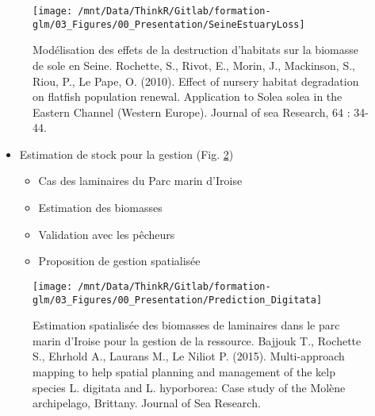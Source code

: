 \documentclass[french,a4paper]{article}
\providecommand{\tightlist}{%
  \setlength{\itemsep}{0pt}\setlength{\parskip}{0pt}}
\begin{document}
\begin{figure}[!h]

{\centering \texttt{[image: /mnt/Data/ThinkR/Gitlab/formation-glm/03\_Figures/00\_Presentation/SeineEstuaryLoss]} 

}

\caption{Modélisation des effets de la destruction d'habitats sur la biomasse de sole en Seine. Rochette, S., Rivot, E., Morin, J., Mackinson, S., Riou, P., Le Pape, O. (2010). Effect of nursery habitat degradation on flatfish population renewal. Application to Solea solea in the Eastern Channel (Western Europe). Journal of sea Research, 64 : 34-44.}\label{fig:figHSIConclusion}
\end{figure}

\begin{itemize}
\tightlist
\item
  Estimation de stock pour la gestion (Fig. \ref{fig:figHSIConcl2})

  \begin{itemize}
  \tightlist
  \item
    Cas des laminaires du Parc marin d'Iroise
  \item
    Estimation des biomasses
  \item
    Validation avec les pêcheurs
  \item
    Proposition de gestion spatialisée
  \end{itemize}
\end{itemize}



\begin{figure}[!h]

{\centering \texttt{[image: /mnt/Data/ThinkR/Gitlab/formation-glm/03\_Figures/00\_Presentation/Prediction\_Digitata]} 

}

\caption{Estimation spatialisée des biomasses de laminaires dans le parc marin d'Iroise pour la gestion de la ressource. Bajjouk T., Rochette S., Ehrhold A., Laurans M., Le Niliot P. (2015). Multi-approach mapping to help spatial planning and management of the kelp species L. digitata and L. hyporborea: Case study of the Molène archipelago, Brittany. Journal of Sea Research.}\label{fig:figHSIConcl2}
\end{figure}
\end{document}
